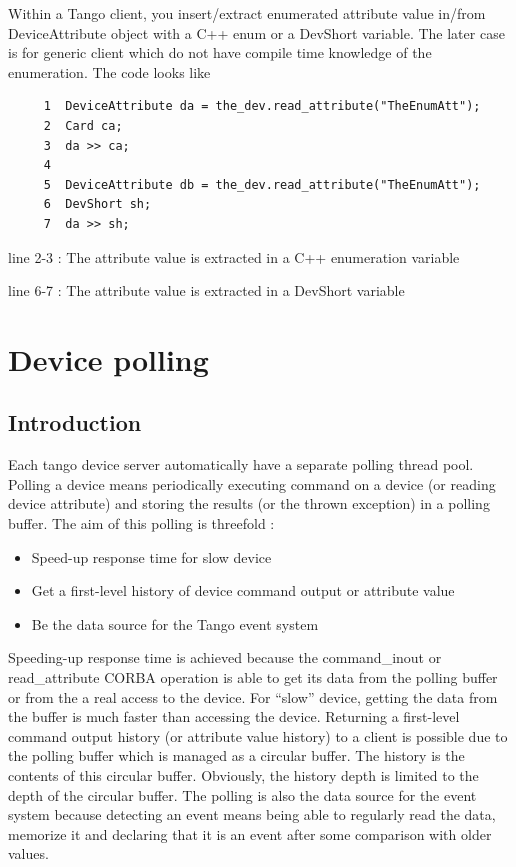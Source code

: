 Within a Tango client, you insert/extract enumerated attribute value
in/from DeviceAttribute object with a C++ enum or a DevShort variable.
The later case is for generic client which do not have compile time
knowledge of the enumeration. The code looks like


\begin{verbatim}
     1  DeviceAttribute da = the_dev.read_attribute("TheEnumAtt");
     2  Card ca;
     3  da >> ca;
     4  
     5  DeviceAttribute db = the_dev.read_attribute("TheEnumAtt");
     6  DevShort sh;
     7  da >> sh;
\end{verbatim}


line 2-3 : The attribute value is extracted in a C++ enumeration variable

line 6-7 : The attribute value is extracted in a DevShort variable


\section{Device polling}


\subsection{Introduction}

Each tango device server automatically have a separate polling
thread pool. Polling a device means periodically executing command
on a device (or reading device attribute) and storing the results
(or the thrown exception) in a polling buffer. The aim of this polling
is threefold :
\begin{itemize}
\item Speed-up response time for slow device
\item Get a first-level history of device command output or attribute value
\item Be the data source for the Tango event system
\end{itemize}
Speeding-up response time is achieved because the command\_inout or
read\_attribute CORBA operation is able to get its data from the polling
buffer or from the a real access to the device. For ``slow'' device,
getting the data from the buffer is much faster than accessing the
device. Returning a first-level command output history (or attribute
value history) to a client is possible due to the polling buffer which
is managed as a circular buffer. The history is the contents of this
circular buffer. Obviously, the history depth is limited to the depth
of the circular buffer. The polling is also the data source for the
event system because detecting an event means being able to regularly
read the data, memorize it and declaring that it is an event after
some comparison with older values.

